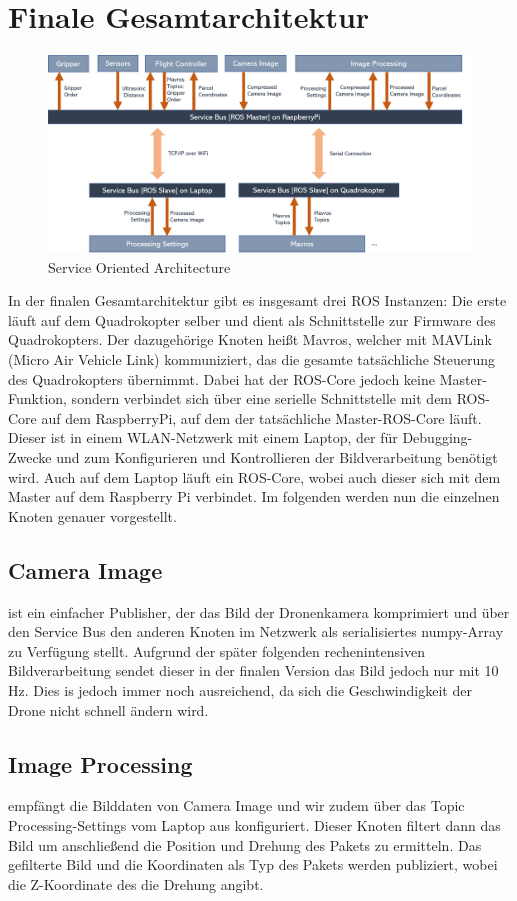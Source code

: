 \section{Finale Gesamtarchitektur}
\begin{figure}[h]
	\centering
	\includegraphics[scale=0.51]{"Grafiken/gesamtarchitektur.png"}
	\caption{Service Oriented Architecture}
	\label{fig:meine-grafik}
\end{figure}
In der finalen Gesamtarchitektur gibt es insgesamt drei ROS Instanzen: Die erste läuft auf dem Quadrokopter selber und dient als Schnittstelle zur Firmware des Quadrokopters. Der dazugehörige Knoten heißt Mavros, welcher mit MAVLink (Micro Air Vehicle Link) kommuniziert, das die gesamte tatsächliche Steuerung des Quadrokopters übernimmt. Dabei hat der ROS-Core jedoch keine Master-Funktion, sondern verbindet sich über eine serielle Schnittstelle mit dem ROS-Core auf dem RaspberryPi, auf dem der tatsächliche Master-ROS-Core läuft. Dieser ist in einem WLAN-Netzwerk mit einem Laptop, der für Debugging-Zwecke und zum Konfigurieren und Kontrollieren der Bildverarbeitung benötigt wird. Auch auf dem Laptop läuft ein ROS-Core, wobei auch dieser sich mit dem Master auf dem Raspberry Pi verbindet. Im folgenden werden nun die einzelnen Knoten genauer vorgestellt.
\subsection{Camera Image} ist ein einfacher Publisher, der das Bild der Dronenkamera komprimiert und über den Service Bus den anderen Knoten im Netzwerk als serialisiertes numpy-Array zu Verfügung stellt. Aufgrund der später folgenden rechenintensiven Bildverarbeitung sendet dieser in der finalen Version das Bild jedoch nur mit 10 Hz. Dies is jedoch immer noch ausreichend, da sich die Geschwindigkeit der Drone nicht schnell ändern wird. 
\subsection{Image Processing} empfängt die Bilddaten von Camera Image und wir zudem über das Topic Processing-Settings vom Laptop aus konfiguriert. Dieser Knoten filtert dann das Bild um anschließend die Position und Drehung des Pakets zu ermitteln. Das gefilterte Bild und die Koordinaten als Typ  des Pakets werden publiziert, wobei die Z-Koordinate des  die Drehung angibt.
